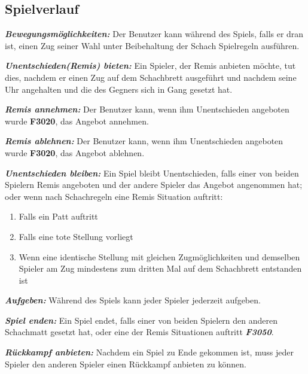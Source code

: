 \documentclass[parskip=full]{scrartcl}
\begin{document}
\subsection{Spielverlauf} 
\begin{description}
	\hypertarget{F3010}{\item[F3010]}\textbf{\textit{Bewegungsmöglichkeiten: }} Der Benutzer kann während des Spiels, falls er dran ist, einen Zug seiner Wahl unter Beibehaltung der Schach Spielregeln ausführen.
	\item[F3020] \textbf{\textit{Unentschieden(Remis) bieten: }} Ein Spieler, der Remis anbieten möchte, tut dies, nachdem er einen Zug auf dem Schachbrett ausgeführt und nachdem seine Uhr angehalten und die des Gegners sich in Gang gesetzt hat.
	\item[F3030] \textbf{\textit{Remis annehmen: }} Der Benutzer kann, wenn ihm Unentschieden angeboten wurde \textbf{F3020}, das Angebot annehmen.
	
	\item[F3040] \textbf{\textit{Remis ablehnen: }} Der Benutzer kann, wenn ihm Unentschieden angeboten wurde \textbf{F3020}, das Angebot ablehnen.
	
	\item[F3050] \textbf{\textit{Unentschieden bleiben: }}
	Ein Spiel bleibt Unentschieden, falls einer von beiden Spielern Remis angeboten und der andere Spieler das Angebot angenommen hat; oder wenn nach Schachregeln eine Remis Situation auftritt:
	\begin{enumerate}
		\item Falls ein \gls{Patt} auftritt
		\item Falls eine \gls{tote Stellung} vorliegt
		\item Wenn eine identische Stellung mit gleichen Zugmöglichkeiten und demselben Spieler am Zug mindestens zum dritten Mal auf dem Schachbrett entstanden ist 
	\end{enumerate}
	
	\item[F3060] \textbf{\textit{Aufgeben: }} Während des Spiels kann jeder Spieler jederzeit aufgeben.
	\item[F3070] \textbf{\textit{Spiel enden: }} Ein Spiel endet, falls einer von beiden Spielern den anderen Schachmatt gesetzt hat, oder eine der Remis Situationen auftritt \textbf{\textit{F3050}}.
	\item[F3080] \textbf{\textit{Rückkampf anbieten: }} Nachdem ein Spiel zu Ende gekommen ist, muss jeder Spieler den anderen Spieler einen Rückkampf anbieten zu können.
\end{description}
\newpage
\end{document}

